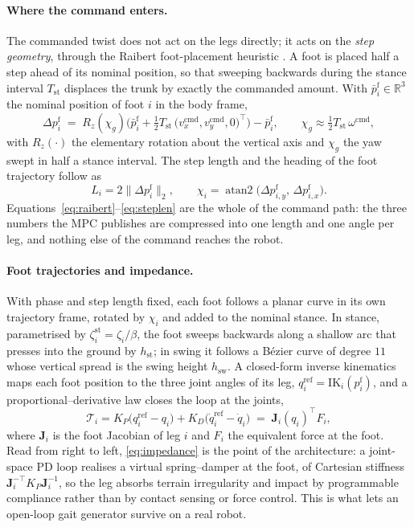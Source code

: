 \documentclass[11pt,a4paper]{article}
\newcommand{\R}{\mathbb{R}}
\newcommand{\Tst}{T_{\mathrm{st}}}
\newcommand{\pf}{p^{\mathrm{f}}}
\begin{document}
\paragraph{Where the command enters.} The commanded twist does not act on the legs directly; it acts on the
\emph{step geometry}, through the Raibert foot-placement heuristic \cite{raibert1986legged}. A foot is placed
half a step ahead of its nominal position, so that sweeping backwards during the stance interval $\Tst$
displaces the trunk by exactly the commanded amount. With $\bar\pf_i\in\R^3$ the nominal position of foot $i$
in the body frame,
\begin{equation}
  \Delta\pf_i \;=\; R_z(\chi_g)\Big(\bar\pf_i+\tfrac{1}{2}\Tst\,
                  \big(v_x^{\mathrm{cmd}},v_y^{\mathrm{cmd}},0\big)^{\!\top}\Big)-\bar\pf_i ,
  \qquad
  \chi_g \approx \tfrac{1}{2}\Tst\,\omega^{\mathrm{cmd}} ,
  \label{eq:raibert}
\end{equation}
with $R_z(\cdot)$ the elementary rotation about the vertical axis and $\chi_g$ the yaw swept in half a stance
interval. The step length and the heading of the foot trajectory follow as
\begin{equation}
  L_i = 2\big\|\Delta\pf_i\big\|_2 ,
  \qquad
  \chi_i=\operatorname{atan2}\big(\Delta\pf_{i,y},\,\Delta\pf_{i,x}\big).
  \label{eq:steplen}
\end{equation}
Equations~\eqref{eq:raibert}--\eqref{eq:steplen} are the whole of the command path: the three numbers the MPC
publishes are compressed into one length and one angle per leg, and nothing else of the command reaches the
robot.

\paragraph{Foot trajectories and impedance.} With phase and step length fixed, each foot follows a planar
curve in its own trajectory frame, rotated by $\chi_i$ and added to the nominal stance. In stance,
parametrised by $\zeta_i^{\mathrm{st}}=\zeta_i/\beta$, the foot sweeps backwards along a shallow arc that
presses into the ground by $h_{\mathrm{st}}$; in swing it follows a B\'ezier curve of degree $11$ whose
vertical spread is the swing height $h_{\mathrm{sw}}$. A closed-form inverse kinematics maps each foot
position to the three joint angles of its leg, $q_i^{\mathrm{ref}}=\mathrm{IK}_i(\pf_i)$, and a
proportional--derivative law closes the loop at the joints,
\begin{equation}
  \mathcal{T}_i = K_P\big(q_i^{\mathrm{ref}}-q_i\big)+K_D\big(\dot q_i^{\mathrm{ref}}-\dot q_i\big)
  \;=\;\bm{J}_i(q_i)^{\!\top}F_i ,
  \label{eq:impedance}
\end{equation}
where $\bm{J}_i$ is the foot Jacobian of leg $i$ and $F_i$ the equivalent force at the foot. Read from right
to left, \eqref{eq:impedance} is the point of the architecture: a joint-space PD loop realises a virtual
spring--damper at the foot, of Cartesian stiffness $\bm{J}_i^{-\top}K_P\bm{J}_i^{-1}$, so the leg absorbs
terrain irregularity and impact by programmable compliance rather than by contact sensing or force control.
This is what lets an open-loop gait generator survive on a real robot.
\end{document}
